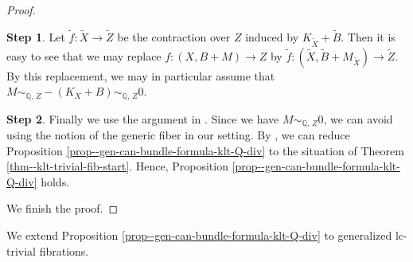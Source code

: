 \documentclass[12pt]{amsart}
\theoremstyle{definition}
\newtheorem{step3}{Step}
\begin{document}
\begin{proof}
\begin{step3}
Let $\tilde{f} \colon \tilde{X} \to \tilde{Z}$ be the contraction over $Z$ induced by $K_{\tilde{X}}+\tilde{B}$. 
Then it is easy to see that we may replace $f\colon (X,B+M) \to Z$ by $\tilde{f} \colon (\tilde{X},\tilde{B}+M_{\tilde{X}}) \to \tilde{Z}$. 
By this replacement, we may in particular assume that $M \sim_{\mathbb{Q},\,Z}-(K_{X}+B) \sim_{\mathbb{Q},\,Z}0$. 
\end{step3}


\begin{step3}\label{step4--prop--gen-can-bundle-formula-klt-Q-div}
Finally we use the argument in \cite[Proof of Theorem 1.4]{filipazzi-gen-can-bundle-formula}. 
Since we have $M \sim_{\mathbb{Q},\,Z}0$, we can avoid using the notion of the generic fiber in our setting. 
By \cite{eh-semistablereduction}, we can reduce Proposition \ref{prop--gen-can-bundle-formula-klt-Q-div} to the situation of Theorem \ref{thm--klt-trivial-fib-start}. 
Hence, Proposition \ref{prop--gen-can-bundle-formula-klt-Q-div} holds. 
\end{step3}

We finish the proof. 
\end{proof}

We extend Proposition \ref{prop--gen-can-bundle-formula-klt-Q-div} to generalized lc-trivial fibrations.   
\end{document}
